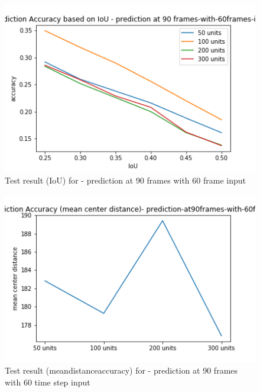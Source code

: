 \begin{figure}[H] 
\includegraphics[scale=0.8]{prediction-at-90frames-with-60frames-input_IoU.png}
\begin{center}
\caption{Test result (IoU) for - prediction at 90 frames with 60 frame input}
\label{60-90-cell-untis-IoU}
\end{center}
\end{figure}

\begin{figure}[H] 
\includegraphics[scale=0.7]{prediction-at-90frames-with-60frames-mean_distance_accuracy}
\begin{center}
\caption{Test result (mean\textunderscore distance\textunderscore accuracy) for - prediction at 90 frames with 60 time step input }
\label{60-90-cell-units-mcd}
\end{center}
\end{figure}


